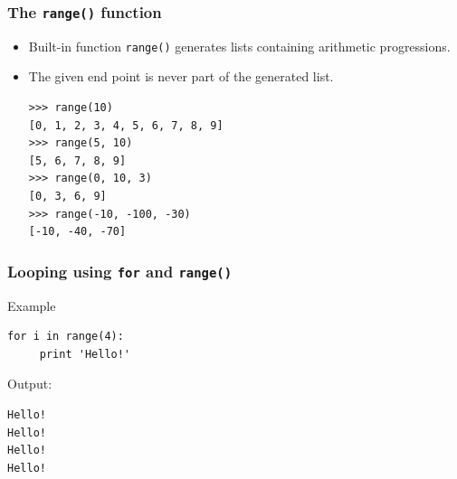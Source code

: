 \documentclass{beamer}
\begin{document}
\begin{frame}[fragile]
\frametitle{The \texttt{range()} function}
\begin{itemize}
\item Built-in function \texttt{range()} generates
lists containing arithmetic progressions.
\item The given end point is \alert{never} part of the generated list.
\begin{verbatim}
>>> range(10)
[0, 1, 2, 3, 4, 5, 6, 7, 8, 9]
>>> range(5, 10)
[5, 6, 7, 8, 9]
>>> range(0, 10, 3)
[0, 3, 6, 9]
>>> range(-10, -100, -30)
[-10, -40, -70]
\end{verbatim}
\end{itemize}

\end{frame}
\begin{frame}[fragile]
\frametitle{Looping using \texttt{for} and \texttt{range()}}
\begin{block}{Example}
\begin{verbatim}
for i in range(4):
     print 'Hello!'
\end{verbatim}
Output:
\begin{verbatim}
Hello!
Hello!
Hello!
Hello!
\end{verbatim}
\end{block}
\end{frame}
\end{document}
